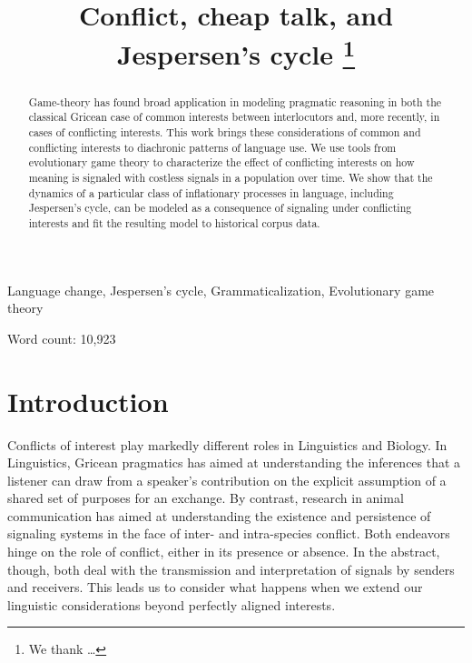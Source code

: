 \documentclass[linguex]{sp}
\title[Conflict, cheap talk, and Jespersen's cycle]{Conflict, cheap talk, and Jespersen's cycle \thanks{We thank  \ldots}}
\author[Ahern \& Clark]{ 
  \spauthor{Christopher Ahern \\ \institute{Department of Linguistics,\\ University of Pennsylvania}} \AND
  \spauthor{Robin Clark \\ \institute{Department of Linguistics,\\ University of Pennsylvania}}
}
\theoremstyle{definition} \newtheorem{definition}{Definition}
\begin{document}
\maketitle

\begin{abstract}
Game-theory has found broad application in modeling pragmatic reasoning in both the classical Gricean case of common interests between interlocutors and, more recently, in cases of conflicting interests. This work brings these considerations of common and conflicting interests to diachronic patterns of language use. We use tools from  evolutionary game theory to characterize the effect of conflicting interests on how meaning is signaled with costless signals in a population over time. We show that the dynamics of a particular class of inflationary processes in language, including Jespersen's cycle, can be modeled as a consequence of signaling under conflicting interests and fit the resulting model to historical corpus data.
\end{abstract}

\begin{keywords}
	 Language change, Jespersen's cycle, Grammaticalization, Evolutionary game theory
\end{keywords}

\noindent
\footnotesize{Word count: 10,923}

\section{Introduction}
\label{Introduction}

Conflicts of interest play markedly different roles in Linguistics and Biology. In Linguistics, Gricean pragmatics has aimed at understanding the inferences that a listener can draw from a speaker's contribution on the explicit assumption of a shared set of purposes for an exchange. By contrast, research in animal communication has aimed at understanding the existence and persistence of signaling systems in the face of inter- and intra-species conflict.  Both endeavors hinge on the role of conflict, either in its presence or absence. In the abstract, though, both deal with the transmission and interpretation of signals by senders and receivers. This leads us to consider what happens when we extend our linguistic considerations beyond perfectly aligned interests. 
\end{document}
